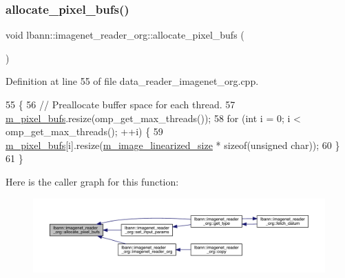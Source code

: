 \subsubsection{\texorpdfstring{allocate\+\_\+pixel\+\_\+bufs()}{allocate\_pixel\_bufs()}}
{\footnotesize\ttfamily void lbann\+::imagenet\+\_\+reader\+\_\+org\+::allocate\+\_\+pixel\+\_\+bufs (\begin{DoxyParamCaption}{ }\end{DoxyParamCaption})\hspace{0.3cm}{\ttfamily [protected]}}



Definition at line 55 of file data\+\_\+reader\+\_\+imagenet\+\_\+org.\+cpp.


\begin{DoxyCode}
55                                               \{
56   \textcolor{comment}{// Preallocate buffer space for each thread.}
57   \hyperlink{classlbann_1_1imagenet__reader__org_ad594a338f0ef9614b63a1950254eb034}{m\_pixel\_bufs}.resize(omp\_get\_max\_threads());
58   \textcolor{keywordflow}{for} (\textcolor{keywordtype}{int} i = 0; i < omp\_get\_max\_threads(); ++i) \{
59     \hyperlink{classlbann_1_1imagenet__reader__org_ad594a338f0ef9614b63a1950254eb034}{m\_pixel\_bufs}[i].resize(\hyperlink{classlbann_1_1image__data__reader_af512f1f866c0f654309b7f28886dca9a}{m\_image\_linearized\_size} * \textcolor{keyword}{sizeof}(\textcolor{keywordtype}{unsigned} \textcolor{keywordtype}{
      char}));
60   \}
61 \}
\end{DoxyCode}
Here is the caller graph for this function\+:\nopagebreak
\begin{figure}[H]
\begin{center}
\leavevmode
\includegraphics[width=350pt]{classlbann_1_1imagenet__reader__org_acbe8ed442b64a7391ffa63b0658641c0_icgraph}
\end{center}
\end{figure}
\mbox{\label{classlbann_1_1imagenet__reader__org_ab13b41829be269110dfe74082918c349}} 
